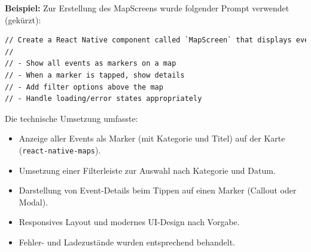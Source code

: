 \textbf{Beispiel:}
Zur Erstellung des MapScreens wurde folgender Prompt verwendet (gekürzt):

\begin{lstlisting}[language=HTML]
// Create a React Native component called `MapScreen` that displays event markers on a map using event data from the `EventsProvider` context. Requirements:
//
// - Show all events as markers on a map
// - When a marker is tapped, show details
// - Add filter options above the map
// - Handle loading/error states appropriately
\end{lstlisting}

Die technische Umsetzung umfasste:
\begin{itemize}
      \item Anzeige aller Events als Marker (mit Kategorie und Titel) auf der Karte
            (\texttt{react-native-maps}).
      \item Umsetzung einer Filterleiste zur Auswahl nach Kategorie und Datum.
      \item Darstellung von Event-Details beim Tippen auf einen Marker (Callout oder
            Modal).
      \item Responsives Layout und modernes UI-Design nach Vorgabe.
      \item Fehler- und Ladezustände wurden entsprechend behandelt.
\end{itemize}

